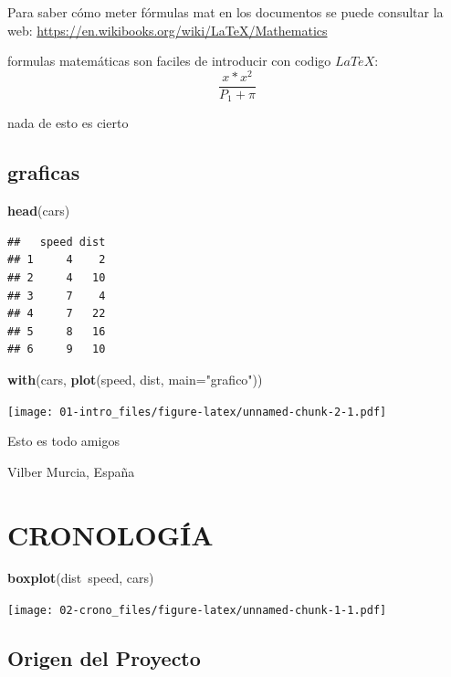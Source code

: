 \documentclass[10pt,spanish,a4paper,oneside]{article}
\newenvironment{Shaded}{\begin{snugshade}}{\end{snugshade}}
\newcommand{\KeywordTok}[1]{\textcolor[rgb]{0.27,0.27,0.27}{\textbf{{#1}}}}
\newcommand{\DataTypeTok}[1]{\textcolor[rgb]{0.27,0.27,0.27}{{#1}}}
\newcommand{\StringTok}[1]{\textcolor[rgb]{0.5,0.5,0.5}{{#1}}}
\newcommand{\NormalTok}[1]{{#1}}
\let\BeginKnitrBlock\begin \let\EndKnitrBlock\end
\begin{document}
Para saber cómo meter fórmulas mat en los documentos se puede consultar
la web: \url{https://en.wikibooks.org/wiki/LaTeX/Mathematics}

formulas matemáticas son faciles de introducir con codigo \(LaTeX\):
\[\frac{x*x^2}{P_1 + \pi}\]

nada de esto es cierto

\subsection{graficas}\label{graficas}

\begin{Shaded}
\begin{Highlighting}[]
\KeywordTok{head}\NormalTok{(cars)}
\end{Highlighting}
\end{Shaded}

\begin{verbatim}
##   speed dist
## 1     4    2
## 2     4   10
## 3     7    4
## 4     7   22
## 5     8   16
## 6     9   10
\end{verbatim}

\begin{Shaded}
\begin{Highlighting}[]
\KeywordTok{with}\NormalTok{(cars, }\KeywordTok{plot}\NormalTok{(speed, dist, }\DataTypeTok{main=}\StringTok{"grafico"}\NormalTok{))}
\end{Highlighting}
\end{Shaded}

\texttt{[image: 01-intro\_files/figure-latex/unnamed-chunk-2-1.pdf]}

Esto es todo amigos

\BeginKnitrBlock{flushright}
Vilber Murcia, España
\EndKnitrBlock{flushright}

\section{\texorpdfstring{CRONOLOGÍA
\label{crono}}{CRONOLOGÍA }}\label{cronologia}

\begin{Shaded}
\begin{Highlighting}[]
\KeywordTok{boxplot}\NormalTok{(dist~speed, cars)}
\end{Highlighting}
\end{Shaded}

\texttt{[image: 02-crono\_files/figure-latex/unnamed-chunk-1-1.pdf]}

\subsection{Origen del Proyecto}\label{origen-del-proyecto}
\end{document}
